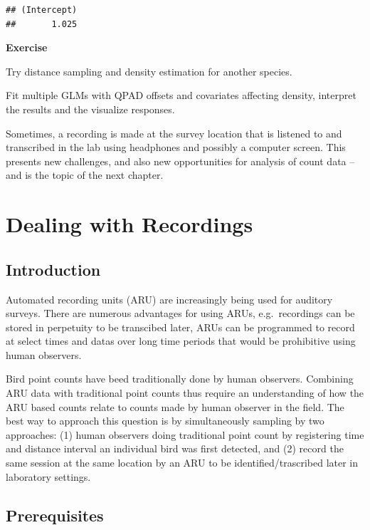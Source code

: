 \documentclass[12pt,]{book}
\let\BeginKnitrBlock\begin \let\EndKnitrBlock\end
\begin{document}
\begin{verbatim}
## (Intercept) 
##       1.025
\end{verbatim}

\BeginKnitrBlock{rmdexercise}
\textbf{Exercise}

Try distance sampling and density estimation for another species.

Fit multiple GLMs with QPAD offsets and covariates affecting density,
interpret the results and the visualize responses.
\EndKnitrBlock{rmdexercise}

Sometimes, a recording is made at the survey location
that is listened to and transcribed in the lab
using headphones and possibly a computer screen.
This presents new challenges, and also new opportunities
for analysis of count data -- and is the topic of the next chapter.

\hypertarget{recordings}{%
\chapter{Dealing with Recordings}\label{recordings}}

\hypertarget{introduction-4}{%
\section{Introduction}\label{introduction-4}}

Automated recording units (ARU) are increasingly being used for auditory
surveys. There are numerous advantages for using ARUs,
e.g.~recordings can be stored in perpetuity to be transcibed
later, ARUs can be programmed to record at select times and datas over long
time periods that would be prohibitive using human observers.

Bird point counts have beed traditionally done by human observers. Combining
ARU data with traditional point counts thus require an understanding of
how the ARU based counts relate to counts made by human observer in the field.
The best way to approach this question is by simultaneously sampling
by two approaches: (1) human observers doing traditional point count
by registering time and distance interval an individual bird was first detected,
and (2) record the same session at the same location by an ARU to be
identified/trascribed later in laboratory settings.

\hypertarget{prerequisites-4}{%
\section{Prerequisites}\label{prerequisites-4}}
\end{document}
